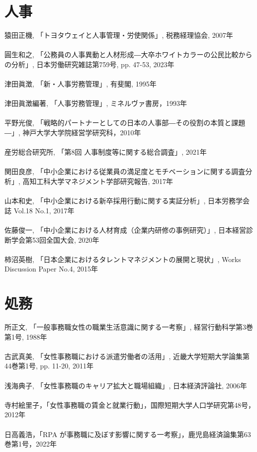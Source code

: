 \section*{人事}
猿田正機, 「トヨタウェイと人事管理・労使関係」, 税務経理協会, 2007年
\\\\
圓生和之, 「公務員の人事異動と人材形成―大卒ホワイトカラーの公民比較からの分析」, 日本労働研究雑誌第759号, pp. 47-53, 2023年
\\\\
津田眞澂, 「新・人事労務管理」, 有斐閣, 1995年
\\\\
津田眞澂編著, 「人事労務管理」, ミネルヴァ書房，1993年
\\\\
平野光俊, 「戦略的パートナーとしての日本の人事部―その役割の本質と課題―」, 神戸大学大学院経営学研究科，2010年
\\\\
産労総合研究所, 「第8回 人事制度等に関する総合調査」, 2021年
\\\\
関田良彦, 「中小企業における従業員の満足度とモチベーションに関する調査分析」, 高知工科大学マネジメント学部研究報告, 2017年
\\\\
山本和史, 「中小企業における新卒採用行動に関する実証分析」, 日本労務学会誌 Vol.18 No.1, 2017年
\\\\
佐藤俊一, 「中小企業における人材育成（企業内研修の事例研究）」, 日本経営診断学会第53回全国大会, 2020年
\\\\
柿沼英樹, 「日本企業におけるタレントマネジメントの展開と現状」, Works Discussion Paper No.4, 2015年

\clearpage
\section*{処務}
所正文, 「一般事務職女性の職業生活意識に関する一考察」, 経営行動科学第3巻第1号, 1988年
\\\\
古武真美, 「女性事務職における派遣労働者の活用」, 近畿大学短期大学論集第44巻第1号, pp. 11-20, 2011年
\\\\
浅海典子, 「女性事務職のキャリア拡大と職場組織」, 日本経済評論社, 2006年
\\\\
寺村絵里子，「女性事務職の賃金と就業行動」，国際短期大学人口学研究第48号，2012年
\\\\
日高義浩，「RPA が事務職に及ぼす影響に関する一考察」，鹿児島経済論集第63巻第1号，2022年


